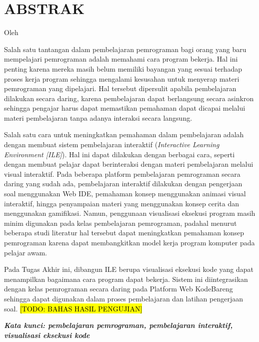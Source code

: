 \clearpage
\chapter*{ABSTRAK}

\begin{center}
  \center
  \large \bfseries \MakeUppercase{\thetitle}

  \normalfont\normalsize
  Oleh

  \theauthor
\end{center}

\vspace{1cm}

\begin{singlespace}
  Salah satu tantangan dalam pembelajaran pemrograman bagi orang yang baru mempelajari pemrograman adalah memahami cara program bekerja. Hal ini penting karena mereka masih belum memiliki bayangan yang sesuai terhadap proses kerja program sehingga mengalami kesusahan untuk menyerap materi pemrograman yang dipelajari. Hal tersebut dipersulit apabila pembelajaran dilakukan secara daring, karena pembelajaran dapat berlangsung secara asinkron sehingga pengajar harus dapat memastikan pemahaman dapat dicapai melalui materi pembelajaran tanpa adanya interaksi secara langsung.

  Salah satu cara untuk meningkatkan pemahaman dalam pembelajaran adalah dengan membuat sistem pembelajaran interaktif (\textit{Interactive Learning Environment [ILE]}). Hal ini dapat dilakukan dengan berbagai cara, seperti dengan membuat pelajar dapat berinteraksi dengan materi pembelajaran melalui visual interaktif. Pada beberapa platform pembelajaran pemrograman secara daring yang sudah ada, pembelajaran interaktif dilakukan dengan pengerjaan soal menggunakan Web IDE, pemahaman konsep menggunakan animasi visual interaktif, hingga penyampaian materi yang menggunakan konsep cerita dan menggunakan gamifikasi. Namun, penggunaan visualisasi eksekusi program masih minim digunakan pada kelas pembelajaran pemrograman, padahal menurut beberapa studi literatur hal tersebut dapat meningkatkan pemahaman konsep pemrograman karena dapat membangkitkan model kerja program komputer pada pelajar awam.

  Pada Tugas Akhir ini, dibangun ILE berupa visualisasi eksekusi kode yang dapat menampilkan bagaimana cara program dapat bekerja. Sistem ini diintegrasikan dengan kelas pemrograman secara daring pada Platform Web KodeBareng sehingga dapat digunakan dalam proses pembelajaran dan latihan pengerjaan soal. \hl{[TODO: BAHAS HASIL PENGUJIAN]}
\end{singlespace}

\textbf{\textit{Kata kunci: pembelajaran pemrograman, pembelajaran interaktif, visualisasi eksekusi kode}}
\clearpage